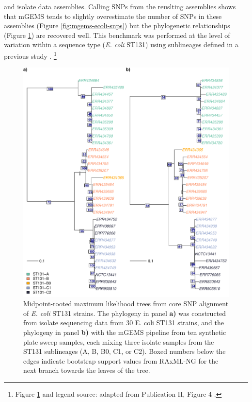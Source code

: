 \documentclass[officiallayout]{tktla}
\let\svthefootnote\thefootnote
\begin{document}
and isolate data assemblies. Calling SNPs from the reuslting assemblies shows that mGEMS
tends to slightly overestimate the number of SNPs in these assemblies
(Figure \ref{fig:mgems-ecoli-snps}) but the phylogenetic relationships (Figure \ref{fig:mgems-ecoli-phylogeny}) are recovered well. This benchmark was
performed at the level of variation within a sequence type
(\textit{E. coli} ST131) using sublineages defined in a previous study
\citep{kallonen2017systematic}.
\noindent\let\thefootnote\relax\footnote{Figure \ref{fig:mgems-ecoli-phylogeny} and legend source: adapted from Publication II, Figure 4 \citep{maklin_bacterial_2021}.}
\addtocounter{footnote}{-1}\let\thefootnote\svthefootnote
\begin{figure}[!t]
    \centering
    \includegraphics[height=0.75\textheight,width=\textwidth,keepaspectratio]{img/reproduced/MGen2021_mGEMS_Figure_4.pdf}
    \caption{Midpoint-rooted maximum likelihood trees from core SNP
      alignment of \textit{E. coli} ST131 strains. The phylogeny in
      panel \textbf{a)} was constructed from isolate sequencing data
      from 30 E. coli ST131 strains, and the phylogeny in panel
      \textbf{b)} with the mGEMS pipeline from ten synthetic plate
      sweep samples, each mixing three isolate samples from the ST131
      sublineages (A, B, B0, C1, or C2). Boxed numbers below the edges
      indicate bootstrap support values from RAxML-NG for the next
      branch towards the leaves of the tree.}
  \label{fig:mgems-ecoli-phylogeny}
\end{figure}
\end{document}

